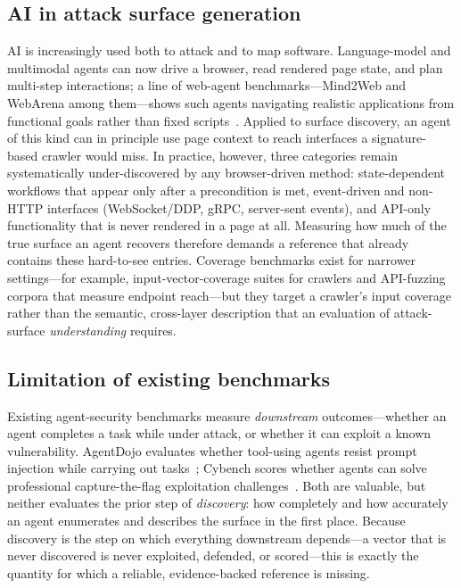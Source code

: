 \documentclass[11pt,a4paper]{article}
\begin{document}
\subsection{AI in attack surface generation}
AI is increasingly used both to attack and to map software. Language-model and
multimodal agents can now drive a browser, read rendered page state, and plan multi-step
interactions; a line of web-agent benchmarks---Mind2Web and WebArena among them---shows
such agents navigating realistic applications from functional goals rather than fixed
scripts~\citep{mind2web,webarena}. Applied to surface discovery, an agent of this kind can
in principle use page context to reach interfaces a signature-based crawler would miss.
In practice, however, three categories remain systematically under-discovered by any
browser-driven method: state-dependent workflows that appear only after a precondition is
met, event-driven and non-HTTP interfaces (WebSocket/DDP, gRPC, server-sent events), and
API-only functionality that is never rendered in a page at all. Measuring how much of the
true surface an agent recovers therefore demands a reference that already contains these
hard-to-see entries. Coverage benchmarks exist for narrower settings---for example,
input-vector-coverage suites for crawlers and API-fuzzing corpora that measure endpoint
reach---but they target a crawler's input coverage rather than the
semantic, cross-layer description that an evaluation of attack-surface \emph{understanding}
requires.

\subsection{Limitation of existing benchmarks}
Existing agent-security benchmarks measure \emph{downstream} outcomes---whether an agent
completes a task while under attack, or whether it can exploit a known vulnerability.
AgentDojo evaluates whether tool-using agents resist prompt injection while carrying out
tasks~\citep{agentdojo}; Cybench scores whether agents can solve professional
capture-the-flag exploitation challenges~\citep{cybench}. Both are valuable, but neither
evaluates the prior step of \emph{discovery}: how completely and how accurately an agent
enumerates and describes the surface in the first place. Because discovery is the step on
which everything downstream depends---a vector that is never discovered is never
exploited, defended, or scored---this is exactly the quantity for which a reliable,
evidence-backed reference is missing.
\end{document}
